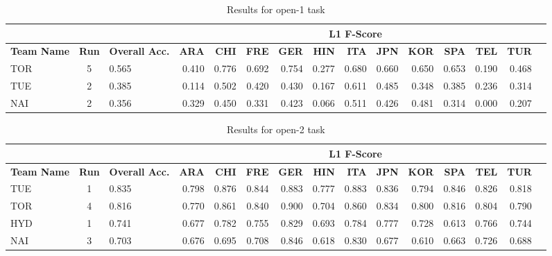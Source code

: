 \documentclass[11pt,letterpaper]{article}
\begin{document}
\begin{table*}
\begin{small}
\begin{tabular}{|p{1cm}|c|p{1cm}|r|r|r|r|r|r|r|r|r|r|r|r|}
\hline

\multicolumn{3}{|c|}{} & \multicolumn{11}{|c|}{\bf L1 F-Score}\\\hline
{\bf Team Name} & {\bf Run} & {\bf Overall Acc.} & {\bf ARA} & {\bf CHI} & {\bf FRE} & {\bf GER} & {\bf HIN} & {\bf ITA} & {\bf JPN} & {\bf KOR} & {\bf SPA} & {\bf TEL} & {\bf TUR}\\\hline
TOR & 5  & 0.565 & 0.410 & 0.776 & 0.692 & 0.754 & 0.277 & 0.680 & 0.660 & 0.650 & 0.653 & 0.190 & 0.468\\\hline
TUE & 2  & 0.385 & 0.114 & 0.502 & 0.420 & 0.430 & 0.167 & 0.611 & 0.485 & 0.348 & 0.385 & 0.236 & 0.314\\\hline
NAI & 2  & 0.356 & 0.329 & 0.450 & 0.331 & 0.423 & 0.066 & 0.511 & 0.426 & 0.481 & 0.314 & 0.000 & 0.207\\\hline
\end{tabular}
\caption{Results for open-1 task\label{tab:results:open1}}
\end{small}
\end{table*}


\begin{table*}
\begin{small}
\begin{tabular}{|p{1cm}|c|p{1cm}|r|r|r|r|r|r|r|r|r|r|r|r|}
\hline

\multicolumn{3}{|c|}{} & \multicolumn{11}{|c|}{\bf L1 F-Score}\\\hline
{\bf Team Name} & {\bf Run} & {\bf Overall Acc.} & {\bf ARA} & {\bf CHI} & {\bf FRE} & {\bf GER} & {\bf HIN} & {\bf ITA} & {\bf JPN} & {\bf KOR} & {\bf SPA} & {\bf TEL} & {\bf TUR}\\\hline
TUE & 1  & 0.835 & 0.798 & 0.876 & 0.844 & 0.883 & 0.777 & 0.883 & 0.836 & 0.794 & 0.846 & 0.826 & 0.818\\\hline
TOR& 4  & 0.816 & 0.770 & 0.861 & 0.840 & 0.900 & 0.704 & 0.860 & 0.834 & 0.800 & 0.816 & 0.804 & 0.790\\\hline
HYD & 1  & 0.741 & 0.677 & 0.782 & 0.755 & 0.829 & 0.693 & 0.784 & 0.777 & 0.728 & 0.613 & 0.766 & 0.744\\\hline
NAI & 3  & 0.703 & 0.676 & 0.695 & 0.708 & 0.846 & 0.618 & 0.830 & 0.677 & 0.610 & 0.663 & 0.726 & 0.688\\\hline
\end{tabular}
\caption{Results for open-2 task\label{tab:results:open1}}
\end{small}
\end{table*}
\end{document}
